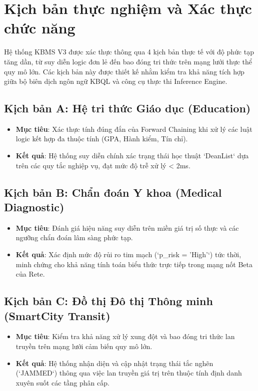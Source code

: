 \section{Kịch bản thực nghiệm và Xác thực chức năng}

Hệ thống KBMS V3 được xác thực thông qua 4 kịch bản thực tế với độ phức tạp tăng dần, từ suy diễn logic đơn lẻ đến bao đóng tri thức trên mạng lưới thực thể quy mô lớn. Các kịch bản này được thiết kế nhằm kiểm tra khả năng tích hợp giữa bộ biên dịch ngôn ngữ KBQL và công cụ thực thi Inference Engine.

\subsection{Kịch bản A: Hệ tri thức Giáo dục (Education)}
\begin{itemize}
    \item \textbf{Mục tiêu}: Xác thực tính đúng đắn của Forward Chaining khi xử lý các luật logic kết hợp đa thuộc tính (GPA, Hành kiểm, Tín chỉ).
    \item \textbf{Kết quả}: Hệ thống suy diễn chính xác trạng thái học thuật `DeanList` dựa trên các quy tắc nghiệp vụ, đạt mức độ trễ xử lý < 2ms.
\end{itemize}

\subsection{Kịch bản B: Chẩn đoán Y khoa (Medical Diagnostic)}
\begin{itemize}
    \item \textbf{Mục tiêu}: Đánh giá hiệu năng suy diễn trên miền giá trị số thực và các ngưỡng chẩn đoán lâm sàng phức tạp.
    \item \textbf{Kết quả}: Xác định mức độ rủi ro tim mạch (`p_risk = 'High'`) tức thời, minh chứng cho khả năng tính toán biểu thức trực tiếp trong mạng nốt Beta của Rete.
\end{itemize}

\subsection{Kịch bản C: Đồ thị Đô thị Thông minh (SmartCity Transit)}
\begin{itemize}
    \item \textbf{Mục tiêu}: Kiểm tra khả năng xử lý xung đột và bao đóng tri thức lan truyền trên mạng lưới cảm biến quy mô lớn.
    \item \textbf{Kết quả}: Hệ thống nhận diện và cập nhật trạng thái tắc nghẽn (`JAMMED`) thông qua việc lan truyền giá trị trên thuộc tính định danh xuyên suốt các tầng phân cấp.
\end{itemize}

